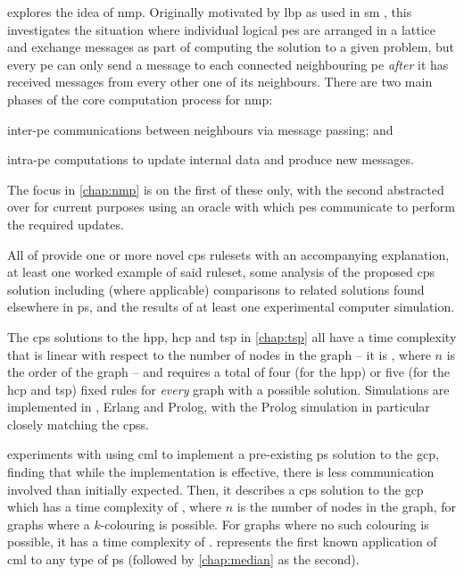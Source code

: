  explores the idea of \gls{nmp}.  Originally motivated by \gls{lbp} \cite{Sun2003,Felzenszwalb2006,Felzenszwalb2011} as used in \gls{sm} \cite{Sinha2020,Tippetts2016,Scharstein2002}, this  investigates the situation where individual logical \glspl{pe} are arranged in a lattice and exchange messages as part of computing the solution to a given problem, but every \gls{pe} can only send a message to each connected neighbouring \gls{pe} \emph{after} it has received messages from every other one of its neighbours.  There are two main phases of the core computation process for \gls{nmp}:
\begin{inparaenum}[a)]
\item inter-\gls{pe} communications between neighbours via message passing; and
\item intra-\gls{pe} computations to update internal data and produce new messages.
\end{inparaenum}  The focus in \cref{chap:nmp} is on the first of these only, with the second abstracted over for current purposes using an oracle with which \glspl{pe} communicate to perform the required updates.

All of  provide one or more novel \gls{cps} \glspl{ruleset} with an accompanying explanation, at least one worked example of said \gls{ruleset}, some analysis of the proposed \gls{cps} solution including (where applicable) comparisons to related solutions found elsewhere in \gls{ps}, and the results of at least one experimental computer simulation.

The \gls{cps} solutions to the \gls{hpp}, \gls{hcp} and \gls{tsp} in \cref{chap:tsp} all have a time complexity that is linear with respect to the number of nodes in the graph -- \ie{} it is , where \(n\) is the order of the graph -- and requires a total of four (for the \gls{hpp}) or five (for the \gls{hcp} and \gls{tsp}) fixed rules for \emph{every} graph with a possible solution.  Simulations are implemented in \fsharp{}, Erlang and Prolog, with the Prolog simulation in particular closely matching the \glspl{cps}.

 experiments with using \gls{cml} to implement a pre-existing \gls{ps} solution to the \gls{gcp}, finding that while the implementation is effective, there is less communication involved than initially expected.  Then, it describes a \gls{cps} solution to the \gls{gcp} which has a time complexity of , where \(n\) is the number of nodes in the graph, for graphs where a \(k\)-colouring is possible.  For graphs where no such colouring is possible, it has a time complexity of .   represents the first known application of \gls{cml} to any type of \gls{ps} (followed by \cref{chap:median} as the second).

